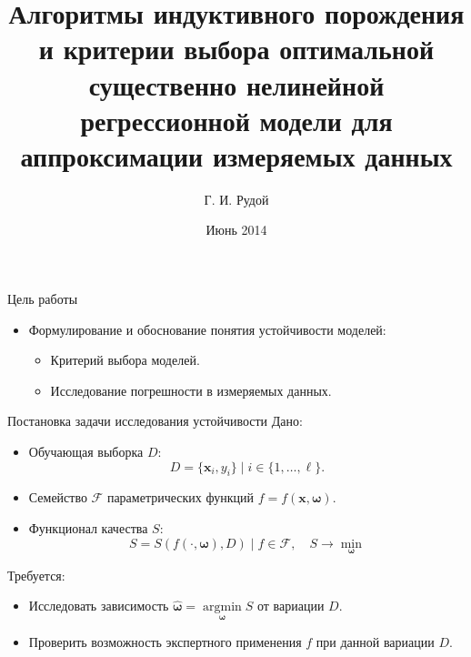 \documentclass{beamer}
\begin{document}
\title[Порождение и выбор моделей\hspace{4em}\insertframenumber/\inserttotalframenumber]{Алгоритмы индуктивного порождения и критерии выбора оптимальной существенно нелинейной регрессионной модели для аппроксимации измеряемых данных}
\author{Г. И. Рудой}
\date{Июнь 2014}

\begin{frame}
  \maketitle
\end{frame}

\begin{frame}{Цель работы}
  \begin{itemize}
	\item Формулирование и обоснование понятия устойчивости моделей:
	\begin{itemize}
	  \item Критерий выбора моделей.
	  \item Исследование погрешности в измеряемых данных.
	\end{itemize}
  \end{itemize}
\end{frame}

\begin{frame}{Постановка задачи исследования устойчивости}
  Дано:
  \begin{itemize}
   \item Обучающая выборка $D$:
     \[
	   D = \{ \mathbf{x}_i, y_i \} \mid i \in \{ 1, \dots, \ell \}.
     \]
   \item Семейство $\mathcal{F}$ параметрических функций $f = f(\mathbf{x}, \boldsymbol{\omega})$.
   \item Функционал качества $S$:
     \[
       S = S (f (\cdot, \boldsymbol{\omega}), D) \mid f \in \mathcal{F}, \quad S \rightarrow \mathop{\min}\limits_{\boldsymbol{\omega}}
     \]
  \end{itemize}
  
  Требуется:
  \begin{itemize}
    \item Исследовать зависимость $\hat{\boldsymbol{\omega}} = \mathop{\arg \min}\limits_{\boldsymbol{\omega}} S$ от вариации $D$.
    \item Проверить возможность экспертного применения $f$ при данной вариации $D$.
  \end{itemize}
\end{frame}
\end{document}
